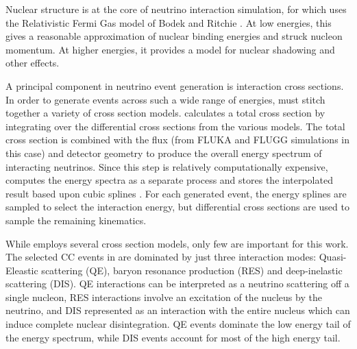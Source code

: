 Nuclear structure is at the core of neutrino interaction simulation, for which
\genie uses the Relativistic Fermi Gas model of Bodek and Ritchie
\cite{bodekritchie}.
At low energies, this gives a reasonable approximation of nuclear binding
energies and struck nucleon momentum.
At higher energies, it provides a model for nuclear shadowing and other
effects.


A principal component in neutrino event generation is interaction cross sections.  In order to generate events across such a wide range of energies, \genie must stitch together a variety of cross section models.  \genie calculates a total cross section by integrating over the differential cross sections from the various models.  The total cross section is combined with the flux (from FLUKA and FLUGG simulations in this case) and detector geometry to produce the overall energy spectrum of interacting neutrinos.
Since this step is relatively computationally expensive, \genie computes the
energy spectra as a separate process and stores the interpolated result
based upon cubic splines \cite{atkinson1978introduction}.
For each generated event, the energy splines are sampled to select the interaction energy, but differential cross sections are used to sample the remaining kinematics.

While \genie employs several cross section models, only few are important for this work.  The selected \numu CC events in \nova are dominated by just three interaction modes: Quasi-Eleastic scattering (QE),  baryon resonance production (RES) and deep-inelastic scattering (DIS).
QE interactions can be interpreted as a neutrino scattering off a single
nucleon, RES interactions involve an excitation
of the nucleus by the neutrino, and DIS represented as an interaction
with the entire nucleus which can induce complete
nuclear disintegration.
QE events dominate the low energy tail of the energy spectrum, while DIS events account for most of the high energy tail.

